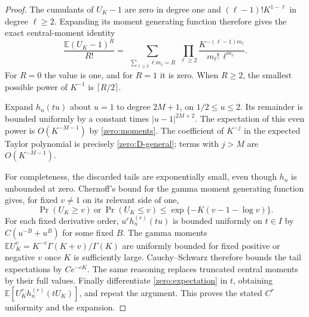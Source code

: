 \documentclass[11pt,a4paper]{article}
\theoremstyle{definition}
\theoremstyle{remark}
\numberwithin{equation}{section}
\begin{document}
\begin{proof}
The cumulants of $U_K-1$ are zero in degree one and
$(\ell-1)!K^{1-\ell}$ in degree $\ell\geq2$.  Expanding its moment
generating function therefore gives the exact central-moment identity
\begin{equation}\label{zero:moments}
 \frac{\mathbb E(U_K-1)^R}{R!}
 =\sum_{\substack{\sum_{\ell\geq2}\ell m_\ell=R}}
       \prod_{\ell\geq2}
       \frac{K^{-(\ell-1)m_\ell}}{m_\ell!\,\ell^{m_\ell}}.
\end{equation}
For $R=0$ the value is one, and for $R=1$ it is zero.
When $R\geq2$, the smallest possible power of $K^{-1}$ is
$\lceil R/2\rceil$.

Expand $h_n(tu)$ about $u=1$ to degree $2M+1$, on
$1/2\leq u\leq2$.  Its remainder is bounded uniformly by a constant
times $|u-1|^{2M+2}$.  The expectation of this even power is
$O(K^{-M-1})$ by \eqref{zero:moments}.  The coefficient of $K^{-j}$
in the expected Taylor polynomial is precisely
\eqref{zero:D-general}; terms with $j>M$ are $O(K^{-M-1})$.

For completeness, the discarded tails are exponentially small, even
though $h_n$ is unbounded at zero.  Chernoff's bound for the gamma
moment generating function gives, for fixed $v\ne1$ on its relevant
side of one,
\[
 \Pr(U_K\geq v)\ \text{or}\ \Pr(U_K\leq v)
       \leq \exp\{-K(v-1-\log v)\}.
\]
For each fixed derivative order, $u^r h_n^{(r)}(tu)$ is bounded
uniformly on $t\in I$ by $C(u^{-B}+u^B)$ for some fixed $B$.
The gamma moments
$\mathbb E U_K^v=K^{-v}\Gamma(K+v)/\Gamma(K)$ are uniformly bounded
for fixed positive or negative $v$ once $K$ is sufficiently large.
Cauchy--Schwarz therefore bounds the tail expectations by
$Ce^{-cK}$.  The same reasoning replaces truncated central moments
by their full values.  Finally differentiate
\eqref{zero:expectation} in $t$, obtaining
$\mathbb E[U_K^r h_n^{(r)}(tU_K)]$, and repeat the argument.
This proves the stated $C^r$ uniformity and the expansion.
\end{proof}
\end{document}
